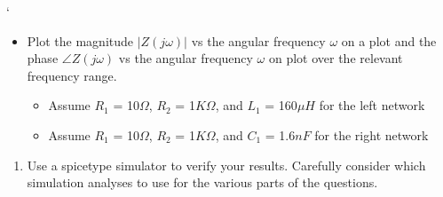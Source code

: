 \documentclass[letterpaper,10pt,english]{jupyterBook}
\begin{document}
\sphinxAtStartPar
{}‘
\begin{itemize}
\item {} 
\sphinxAtStartPar
Plot the magnitude \(|Z(j\omega)|\) vs the angular frequency \(\omega\) on a  plot and the phase \(\angle Z(j\omega)\) vs the angular frequency \(\omega\) on  plot over the relevant frequency range.
\begin{itemize}
\item {} 
\sphinxAtStartPar
Assume \(R_1\) = 10\(\Omega\), \(R_2\) = 1\(K\Omega\), and \(L_1\) = 160\(\mu H\) for the left network

\item {} 
\sphinxAtStartPar
Assume \(R_1\) = 10\(\Omega\), \(R_2\) = 1\(K\Omega\), and \(C_1\) = 1.6\(nF\) for the right network

\end{itemize}

\end{itemize}
\begin{enumerate}
%
\setcounter{enumi}{3}
\item {} 
\sphinxAtStartPar
Use a spice\sphinxhyphen{}type simulator to verify your results. Carefully consider which simulation analyses to use for the various parts of the questions.

\end{enumerate}
\end{document}
